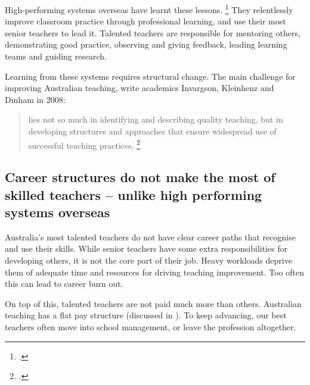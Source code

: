 \documentclass{grattan}
\begin{document}
High-performing systems overseas have learnt these lessons. \footcites{Jensen2012CatchingUpLearning}{Jensen2016PDTeacherProfessional}{OECD2011StrongPerformersSuccessful}{Barber2007HowWorldsBest}
They relentlessly improve classroom practice through professional learning, and use their most senior teachers to lead it.
Talented teachers are responsible for mentoring others, demonstrating good practice, observing and giving feedback, leading learning teams and guiding research.

Learning from these systems requires structural change.
The main challenge for improving Australian teaching, write academics Invargson, Kleinhenz and Dinham in 2008:


\begin{quote}
lies not so much in identifying and describing quality teaching, but in developing structures and approaches that ensure widespread use of successful teaching practices.%
\footcite{Dinham2016LearningLeadingTeaching}
\end{quote}

\subsection{Career structures do not make the most of skilled teachers -- unlike high performing systems overseas}\label{subsec:career-structures-do-not-make-the-most-of-skilled-teachers-unlike-high-performing-systems-overseas}

Australia's most talented teachers do not have clear career paths that recognise and use their skills.
While senior teachers have some extra responsibilities for developing others, it is not the core part of their job.
Heavy workloads deprive them of adequate time and resources for driving teaching improvement.
Too often this can lead to career burn out.

On top of this, talented teachers are not paid much more than others.
Australian teaching has a flat pay structure (discussed in ).
To keep advancing, our best teachers often move into school management, or leave the profession altogether.
\end{document}
